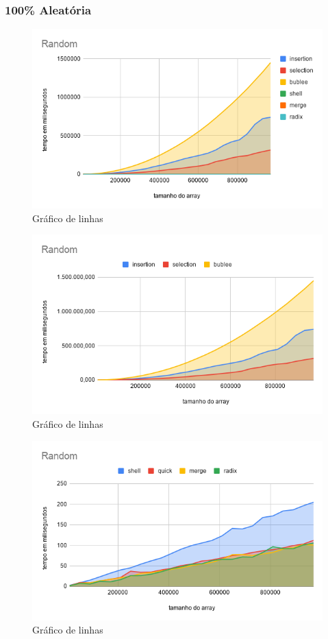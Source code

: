 \documentclass[a4paper, 12pt]{article}
\begin{document}
$  $ \\
\subsubsection{100\% Aleatória}

	\begin{figure}[!h]
	\caption{ Gráfico de linhas }
	\label{fig:random1}
	\centering
	\includegraphics[width=1\textwidth, height=0.60\textwidth]{Random}
	
\end{figure}
\begin{figure}[!h]
	\caption{ Gráfico de linhas }
	\label{fig:random2}
	\centering
	\includegraphics[width=1\textwidth, height=0.57\textwidth]{Random_1}
\end{figure}

\begin{figure}[!h]
	\caption{ Gráfico de linhas }
	\label{fig:random3}
	\centering
	\includegraphics[width=1\textwidth, height=0.57\textwidth]{Random_2}
\end{figure}
\newpage
\end{document}

